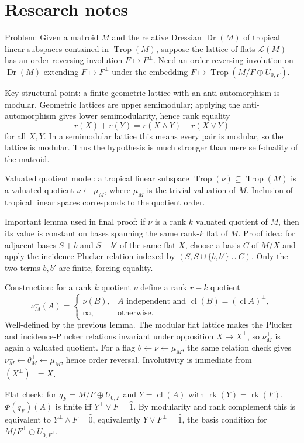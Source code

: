 \documentclass[12pt]{article}
\newcommand{\Dr}{\operatorname{Dr}}\newcommand{\Trop}{\operatorname{Trop}}\newcommand{\rk}{\operatorname{rk}}\newcommand{\cl}{\operatorname{cl}}
\begin{document}
\section*{Research notes}

Problem: Given a matroid $M$ and the relative Dressian $\Dr(M)$ of tropical
linear subspaces contained in $\Trop(M)$, suppose the lattice of flats
$\mathcal L(M)$ has an order-reversing involution $F\mapsto F^\perp$. Need
an order-reversing involution on $\Dr(M)$ extending
$F\mapsto F^\perp$ under the embedding
$F\mapsto \Trop(M/F\oplus U_{0,F})$.

Key structural point: a finite geometric lattice with an anti-automorphism is
modular. Geometric lattices are upper semimodular; applying the anti-automorphism
gives lower semimodularity, hence rank equality
\[
r(X)+r(Y)=r(X\wedge Y)+r(X\vee Y)
\]
for all $X,Y$. In a semimodular lattice this means every pair is modular, so the
lattice is modular. Thus the hypothesis is much stronger than mere
self-duality of the matroid.

Valuated quotient model: a tropical linear subspace
$\Trop(\nu)\subseteq \Trop(M)$ is a valuated quotient
$\nu\leftarrow \mu_M$, where $\mu_M$ is the trivial valuation of $M$.
Inclusion of tropical linear spaces corresponds to the quotient order.

Important lemma used in final proof: if $\nu$ is a rank $k$ valuated quotient of
$M$, then its value is constant on bases spanning the same rank-$k$ flat of $M$.
Proof idea: for adjacent bases $S+b$ and $S+b'$ of the same flat $X$, choose a
basis $C$ of $M/X$ and apply the incidence-Plucker relation indexed by
$(S,S\cup\{b,b'\}\cup C)$. Only the two terms $b,b'$ are finite, forcing
equality.

Construction: for a rank $k$ quotient $\nu$ define a rank $r-k$ quotient
\[
\nu^\perp_M(A)=
\begin{cases}
\nu(B),& A\text{ independent and } \cl(B)=(\cl A)^\perp,\\
\infty,&\text{otherwise}.
\end{cases}
\]
Well-defined by the previous lemma. The modular flat lattice makes the
Plucker and incidence-Plucker relations invariant under opposition
$X\mapsto X^\perp$, so $\nu^\perp_M$ is again a valuated quotient.
For a flag $\theta\leftarrow\nu\leftarrow\mu_M$, the same relation check gives
$\nu^\perp_M\leftarrow\theta^\perp_M\leftarrow\mu_M$, hence order reversal.
Involutivity is immediate from $(X^\perp)^\perp=X$.

Flat check: for $q_F=M/F\oplus U_{0,F}$ and $Y=\cl(A)$ with
$\rk(Y)=\rk(F)$, $\Phi(q_F)(A)$ is finite iff $Y^\perp\vee F=\hat1$.
By modularity and rank complement this is equivalent to
$Y^\perp\wedge F=\hat0$, equivalently $Y\vee F^\perp=\hat1$, the basis
condition for $M/F^\perp\oplus U_{0,F^\perp}$.
\end{document}
